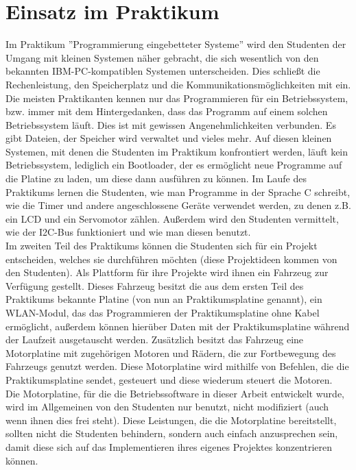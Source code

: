 \chapter{Einsatz im Praktikum}
Im Praktikum ''Programmierung eingebetteter Systeme'' wird den Studenten der
Umgang mit kleinen Systemen näher gebracht, die sich wesentlich von den bekannten IBM-PC-kompatiblen
Systemen unterscheiden. Dies schließt die Rechenleistung, den Speicherplatz und die
Kommunikationsmöglichkeiten mit ein. Die meisten Praktikanten kennen nur das Programmieren
für ein Betriebssystem, bzw. immer mit dem Hintergedanken, dass das Programm auf einem
solchen Betriebssystem läuft. Dies ist mit gewissen Angenehmlichkeiten verbunden. Es gibt
Dateien, der Speicher wird verwaltet und vieles mehr. Auf diesen kleinen Systemen, mit denen die Studenten im
Praktikum konfrontiert werden, läuft kein Betriebssystem, lediglich ein Bootloader, der
es ermöglicht neue Programme auf die Platine zu laden, um diese dann ausführen zu können.
Im Laufe des Praktikums lernen die Studenten, wie man Programme in der Sprache C schreibt, wie die Timer
und andere angeschlossene Geräte verwendet werden, zu denen z.B. ein LCD und ein Servomotor zählen.
Außerdem wird den Studenten vermittelt, wie der I2C-Bus funktioniert und wie man diesen benutzt.\\
Im zweiten Teil des Praktikums können die Studenten sich für ein Projekt entscheiden,
welches sie durchführen möchten (diese Projektideen kommen von den Studenten).
Als Plattform für ihre Projekte wird ihnen ein Fahrzeug zur Verfügung gestellt. Dieses
Fahrzeug besitzt die aus dem ersten Teil des Praktikums bekannte Platine (von nun an
Praktikumsplatine genannt), ein WLAN-Modul, das das Programmieren der Praktikumsplatine
ohne Kabel ermöglicht, außerdem können hierüber Daten mit der Praktikumsplatine während
der Laufzeit ausgetauscht werden. Zusätzlich besitzt das Fahrzeug eine Motorplatine mit
zugehörigen Motoren und Rädern, die zur Fortbewegung des Fahrzeugs genutzt werden. Diese
Motorplatine wird mithilfe von Befehlen, die die Praktikumsplatine sendet, gesteuert und
diese wiederum steuert die Motoren.\\
Die Motorplatine, für die die Betriebssoftware in dieser Arbeit entwickelt wurde, wird
im Allgemeinen von den Studenten nur benutzt, nicht modifiziert (auch wenn ihnen dies
frei steht). Diese Leistungen, die die Motorplatine bereitstellt, sollten nicht die Studenten
behindern, sondern auch einfach anzusprechen sein, damit diese sich auf das Implementieren
ihres eigenes Projektes konzentrieren können.\\
